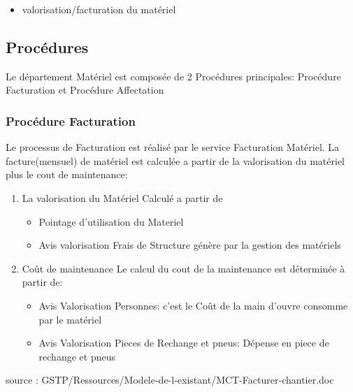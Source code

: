 \documentclass [a4paper] {report}
\begin{document}
	\begin{itemize}
		\item valorisation/facturation du matériel\\
	\end{itemize}		

\subsection{Procédures}
	
Le département Matériel est composée de 2 Procédures principales: Procédure Facturation et Procédure Affectation

\subsubsection{Procédure Facturation}
	Le processus de Facturation est réalisé par le service Facturation Matériel. La facture(mensuel) de matériel est calculée a partir de 
	la valorisation du matériel plus le cout de maintenance:\\
\begin {enumerate}
	\item La valorisation du Matériel
		Calculé a partir de \\
		\begin{itemize}
			\item Pointage d'utilisation du Materiel\\
			\item Avis valorisation Frais de Structure génère par la gestion des matériels	\\
		\end{itemize}	
	\item Coût de maintenance
		Le calcul du cout de la maintenance est déterminée à partir de:\\
		\begin{itemize}
			\item Avis Valorisation Personnes: c'est le Coût de la main d'ouvre  consomme par le matériel\\
			\item Avis Valorisation Pieces de Rechange et pneus: Dépense en piece de rechange et pneus \\
		\end{itemize}

\end{enumerate}

source : GSTP/Ressources/Modele-de-l-existant/MCT-Facturer-chantier.doc

\hfill\\
\hfill\\
\end{document}
